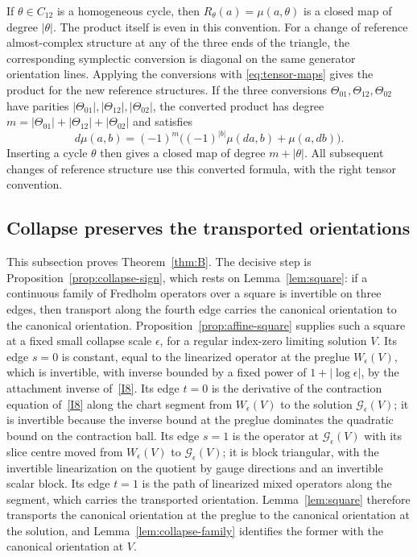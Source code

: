 \documentclass[11pt]{amsart}
\theoremstyle{definition}
\theoremstyle{remark}
\theoremstyle{plain}
\numberwithin{equation}{section}
\begin{document}
If $\theta\in C_{12}$ is a homogeneous cycle, then
$R_\theta(a)=\mu(a,\theta)$ is a closed map of degree
$|\theta|$. The product itself is even in this convention.
For a change of reference almost-complex structure at any of the
three ends of the triangle,
the corresponding symplectic conversion is diagonal on
the same generator orientation lines. Applying the conversions with
\eqref{eq:tensor-maps} gives the product for the new reference structures.
If the three conversions $\Theta_{01},\Theta_{12},\Theta_{02}$ have parities
$|\Theta_{01}|,|\Theta_{12}|,|\Theta_{02}|$, the converted product has degree
$m=|\Theta_{01}|+|\Theta_{12}|+|\Theta_{02}|$ and satisfies
\[
d\mu(a,b)=(-1)^m\bigl((-1)^{|b|}\mu(da,b)+\mu(a,db)\bigr).
\]
Inserting a cycle $\theta$ then gives a closed map of degree
$m+|\theta|$. All subsequent changes of reference structure use this converted
formula, with the right tensor convention.

\subsection{Collapse preserves the transported orientations}
This subsection proves Theorem~\ref{thm:B}. The decisive step is
Proposition~\ref{prop:collapse-sign}, which rests on
Lemma~\ref{lem:square}: if a continuous family of Fredholm operators over
a square is invertible on three edges, then transport along the fourth
edge carries the canonical orientation to the canonical orientation.
Proposition~\ref{prop:affine-square} supplies such a square at a fixed
small collapse scale $\epsilon$, for a regular index-zero limiting
solution $V$. Its edge $s=0$ is constant, equal to the linearized
operator at the preglue $W_\epsilon(V)$, which is invertible, with
inverse bounded by a fixed power of $1+|\log\epsilon|$, by the attachment
inverse of~\ref{I8}. Its edge $t=0$ is the derivative of the contraction
equation of~\ref{I8} along the chart
segment from $W_\epsilon(V)$ to the solution $\mathcal G_\epsilon(V)$; it
is invertible because the inverse bound at the preglue dominates the
quadratic bound on the contraction ball. Its edge $s=1$ is the operator
at $\mathcal G_\epsilon(V)$ with its slice centre moved from
$W_\epsilon(V)$ to $\mathcal G_\epsilon(V)$; it is block triangular, with
the invertible linearization on the quotient by gauge directions and an
invertible scalar block. Its edge $t=1$ is the path of linearized mixed
operators along the segment, which carries the transported orientation.
Lemma~\ref{lem:square} therefore transports the canonical orientation at
the preglue to the canonical orientation at the solution, and
Lemma~\ref{lem:collapse-family} identifies the former with the canonical
orientation at $V$.
\end{document}
